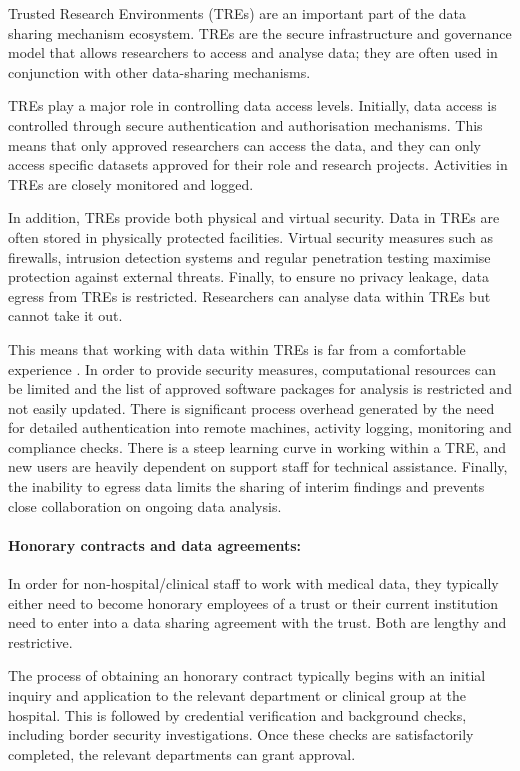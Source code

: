 \documentclass[11pt]{article}
\begin{document}
Trusted Research Environments (TREs) are an important part of the data sharing mechanism ecosystem. TREs are the secure infrastructure and governance model that allows researchers to access and analyse data; they are often used in conjunction with other data-sharing mechanisms.

TREs play a major role in controlling data access levels. Initially, data access is controlled through secure authentication and authorisation mechanisms. This means that only approved researchers can access the data, and they can only access specific datasets approved for their role and research projects. Activities in TREs are closely monitored and logged.

In addition, TREs provide both physical and virtual security. Data in TREs are often stored in physically protected facilities. Virtual security measures such as firewalls, intrusion detection systems and regular penetration testing maximise protection against external threats.  Finally, to ensure no privacy leakage, data egress from TREs is restricted. Researchers can analyse data within TREs but cannot take it out.

This means that working with data within TREs is far from a comfortable experience \cite{ODonovan2023}. In order to provide security measures, computational resources can be limited and the list of approved software packages for analysis is restricted and not easily updated. There is significant process overhead generated by the need for detailed authentication into remote machines, activity logging, monitoring and compliance checks. There is a steep learning curve in working within a TRE, and new users are heavily dependent on support staff for technical assistance. Finally, the inability to egress data limits the sharing of interim findings and prevents close collaboration on ongoing data analysis.

\paragraph{Honorary contracts and data agreements:}

In order for non-hospital/clinical staff to work with medical data, they typically either need to become honorary employees of a trust or their current institution need to enter into a data sharing agreement with the trust. Both are lengthy and restrictive.

The process of obtaining an honorary contract typically begins with an initial inquiry and application to the relevant department or clinical group at the hospital. This is followed by credential verification and background checks, including border security investigations. Once these checks are satisfactorily completed, the relevant departments can grant approval. 
\end{document}
